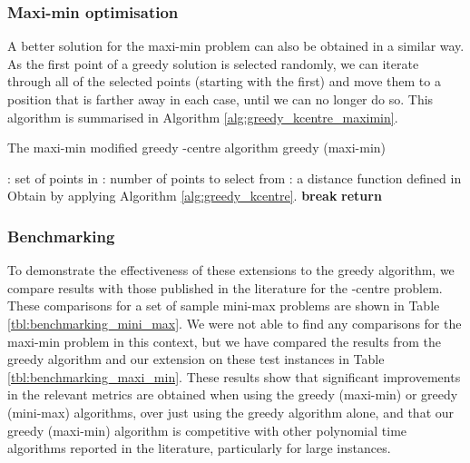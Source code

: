 \documentclass{article}
\begin{document}
\subsubsection{Maxi-min optimisation}
\label{sec:space_filling_design_greedy_k_centers_maxi_min}

A better solution for the maxi-min problem can also be obtained in a similar way. As the first point of a greedy solution is selected randomly, we can iterate through all of the selected points (starting with the first) and move them to a position that is farther away in each case, until we can no longer do so. This algorithm is summarised in Algorithm \ref{alg:greedy_kcentre_maximin}.

\begin{algorithm}
\caption{The maxi-min modified greedy -centre algorithm \textemdash{} greedy (maxi-min)}\label{alg:greedy_kcentre_maximin}
\begin{algorithmic}
\Require : set of points in 
\Require : number of points to select from  
\Require : a distance function defined in 
\State Obtain  by applying Algorithm \ref{alg:greedy_kcentre}.
\While{}
    \State 
        \State 
        \State 
        \State 
    \EndFor
    \If{}
        \State \textbf{break}
    \Else
        \State 
    \EndIf
\EndWhile
\State \textbf{return} 
\end{algorithmic}
\end{algorithm}

\subsubsection{Benchmarking}
\label{sec:space_filling_design_greedy_benchmarking}

To demonstrate the effectiveness of these extensions to the greedy algorithm, we compare results with those published in the literature for the -centre problem. These comparisons for a set of sample mini-max problems are shown in Table \ref{tbl:benchmarking_mini_max}. We were not able to find any comparisons for the maxi-min problem in this context, but we have compared the results from the greedy algorithm and our extension on these test instances in Table \ref{tbl:benchmarking_maxi_min}. These results show that significant improvements in the relevant metrics are obtained when using the greedy (maxi-min) or greedy (mini-max) algorithms, over just using the greedy algorithm alone, and that our greedy (maxi-min) algorithm is competitive with other polynomial time algorithms reported in the literature, particularly for large instances.
\end{document}
